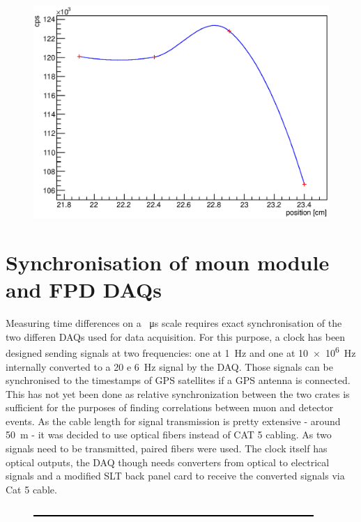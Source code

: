 \begin{figure}
\begin{minipage}[d]{0.24 \textwidth}
	\end{minipage}
	\begin{minipage}[d]{0.24 \textwidth}
		  \includegraphics[width=\textwidth]{graphics/cobalt/modules/8B.eps}
	\end{minipage}
	
	
  \end{figure}

  \section{Synchronisation of moun module and FPD DAQs}
  \label{ch:Analysis:sec:Synchronisation of moun module and FPD DAQs}
  Measuring time differences on a \SI{}{\micro\second} scale requires exact synchronisation of the two differen DAQs used for data acquisition. For this purpose, a clock has been designed sending signals at two frequencies: one at \SI{1}{\hertz} and one at \SI{10e6}{\hertz} internally converted to a \SI{20 e 6}{\hertz} signal by the DAQ. Those signals can be synchronised to the timestamps of GPS satellites if a GPS antenna is connected. This has not yet been done as relative synchronization between the two crates is sufficient for the purposes of finding correlations between muon and detector events. As the cable length for signal transmission is pretty extensive - around \SI{50}{\meter} - it was decided to use optical fibers instead of CAT 5 cabling. As two signals need to be transmitted, paired  fibers were used. The clock itself has optical outputs, the DAQ though needs converters from optical to electrical signals and a modified SLT back panel card to receive the converted 
signals via Cat 5 cable.
  \begin{figure}
  	\includegraphics[width = 0.9 \textwidth]{graphics/dummy.eps}
  \end{figure}

